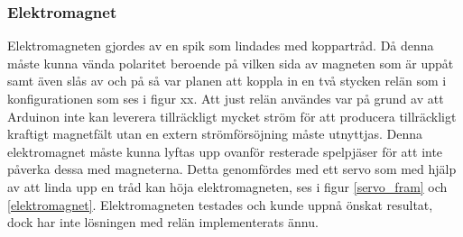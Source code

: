 \documentclass[a4paper]{article}
\begin{document}
\subsubsection*{Elektromagnet}
Elektromagneten gjordes av en spik som lindades med koppartråd.
Då denna måste kunna vända polaritet beroende på vilken sida av magneten som är uppåt samt även slås av och på så var planen att koppla in en två stycken relän som i konfigurationen som ses i figur xx. Att just relän användes var på grund av att Arduinon inte kan leverera tillräckligt mycket ström för att producera tillräckligt kraftigt magnetfält utan en extern strömförsöjning måste utnyttjas.
Denna elektromagnet måste kunna lyftas upp ovanför resterade spelpjäser för att inte påverka dessa med magneterna.
Detta genomfördes med ett servo som med hjälp av att linda upp en tråd kan höja elektromagneten, ses i figur \ref{servo_fram} och \ref{elektromagnet}.
Elektromagneten testades och kunde uppnå önskat resultat, dock har inte lösningen med relän implementerats ännu.
\end{document}
